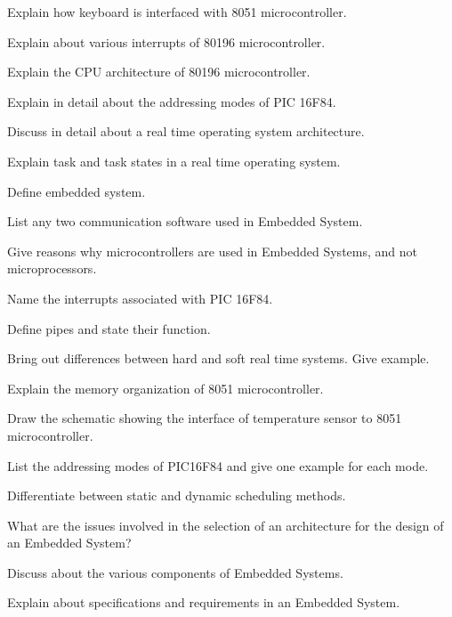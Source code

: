 \newpage \again

\item \iitem Explain how keyboard is interfaced with 8051 microcontroller.
\Or
\item Explain about various interrupts of 80196 microcontroller.
\ene

\item \iitem Explain the CPU architecture of 80196 microcontroller.
\Or
\item Explain in detail about the addressing modes of PIC 16F84.
\ene

\item \iitem Discuss in detail about a real time operating system architecture.
\Or
\item Explain task and task states in a real time operating system.
\ene

\markC
\ene

\newpage

\sub{\subj}
\maxtime

\partA

\iitem Define embedded system.
\item List any two communication software used in Embedded System.
\item Give reasons why microcontrollers are used in Embedded Systems, and not
  microprocessors.
\item Name the interrupts associated with PIC 16F84.
\item Define pipes and state their function.

\markA
\partB

\item Bring out differences between hard and soft real time systems. Give example.
\item Explain the memory organization of 8051 microcontroller.
\item Draw the schematic showing the interface of temperature sensor to 8051 microcontroller.
\item List the addressing modes of PIC16F84 and give one example for each mode.
\item Differentiate between static and dynamic scheduling methods.
\item What are the issues involved in the selection of an architecture for the design of an Embedded System?

\markB
\partC

\item \iitem Discuss about the various components of Embedded Systems.
\Or
\item Explain about specifications and requirements in an Embedded System.
\ene

